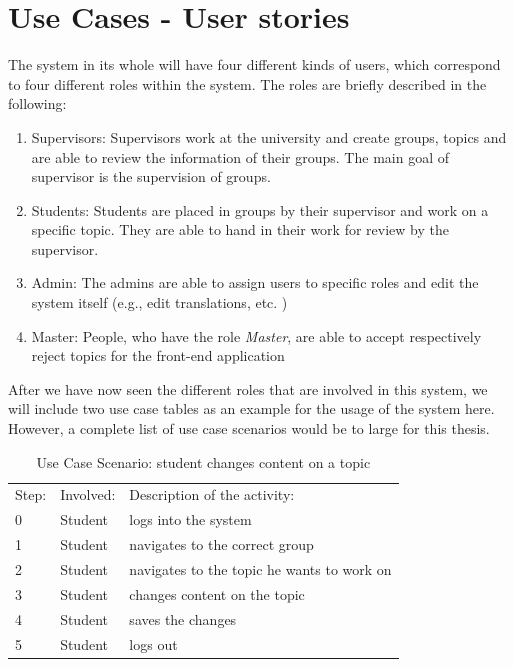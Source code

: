 \section{Use Cases - User stories}
The system in its whole will have four different kinds of users, which correspond to four different roles within the system. The roles are briefly described in the following:

\begin{enumerate}
	\item Supervisors: Supervisors work at the university and create groups, topics and are able to review the information of their groups. The main goal of supervisor is the supervision of groups.
	\item Students: Students are placed in groups by their supervisor and work on a specific topic. They are able to hand in their work for review by the supervisor. 
	\item Admin: The admins are able to assign users to specific roles and edit the system itself (e.g., edit translations, etc. )
	\item Master: People, who have the role \textit{Master}, are able to accept respectively reject topics for the front-end application
\end{enumerate}


After we have now seen the different roles that are involved in this system, we will include two use case tables as an example for the usage of the system here. However, a complete list of use case scenarios would be to large for this thesis.

 \begin{table}[h]
\scriptsize
 \caption{Use Case Scenario: student changes content on a topic}
 \begin{tabular}{lll}
	\toprule
  Step: & Involved: & Description of the activity: \\ 
\cmidrule(rl){1-1}\cmidrule(rl){2-2}\cmidrule(rl){3-3}
  	0 	& Student & logs into the system \\
	1	& Student	& navigates to the correct group \\
	2	& Student & navigates to the topic he wants to work on \\
	3	& Student & changes content on the topic \\
	4	& Student & saves the changes \\	
	5	& Student & logs out \\
	\bottomrule
 \end{tabular}
 \label{tab:ucTopicChange}
 \end{table} 

